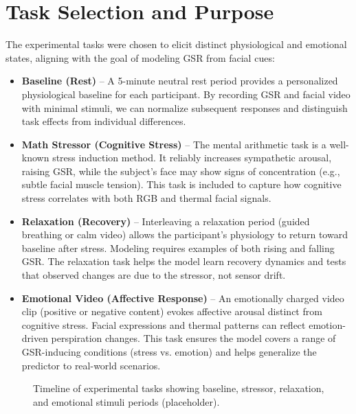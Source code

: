 \section{Task Selection and Purpose}
The experimental tasks were chosen to elicit distinct physiological and emotional states, aligning with the goal of modeling GSR from facial cues:
\begin{itemize}
    \item \textbf{Baseline (Rest)} -- A 5-minute neutral rest period provides a personalized physiological baseline for each participant. By recording GSR and facial video with minimal stimuli, we can normalize subsequent responses and distinguish task effects from individual differences.
    \item \textbf{Math Stressor (Cognitive Stress)} -- The mental arithmetic task is a well-known stress induction method. It reliably increases sympathetic arousal, raising GSR, while the subject’s face may show signs of concentration (e.g., subtle facial muscle tension). This task is included to capture how cognitive stress correlates with both RGB and thermal facial signals.
    \item \textbf{Relaxation (Recovery)} -- Interleaving a relaxation period (guided breathing or calm video) allows the participant’s physiology to return toward baseline after stress. Modeling requires examples of both rising and falling GSR. The relaxation task helps the model learn recovery dynamics and tests that observed changes are due to the stressor, not sensor drift.
    \item \textbf{Emotional Video (Affective Response)} -- An emotionally charged video clip (positive or negative content) evokes affective arousal distinct from cognitive stress. Facial expressions and thermal patterns can reflect emotion-driven perspiration changes. This task ensures the model covers a range of GSR-inducing conditions (stress vs. emotion) and helps generalize the predictor to real-world scenarios.
\end{itemize}
\begin{figure}[h]
    \centering
    \caption{Timeline of experimental tasks showing baseline, stressor, relaxation, and emotional stimuli periods (placeholder).}
\end{figure}


